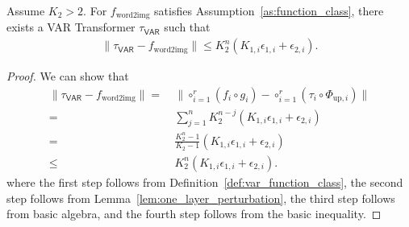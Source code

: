 \begin{theorem}\label{thm:var_universality}
    Assume $K_2 > 2$.
    For $f_\mathrm{word2img}$ satisfies Assumption~\ref{as:function_class}, there exists a VAR Transformer $\tau_{\mathsf{VAR}}$ such that
    \begin{align*}
        \|\tau_{\mathsf{VAR}} - f_\mathrm{word2img} \| \leq K_2^n( K_{1,i} \epsilon_{1,i} + \epsilon_{2,i} ).
    \end{align*}
\end{theorem}
\begin{proof}
    We can show that
    \begin{align*}
        \|\tau_{\mathsf{VAR}} - f_\mathrm{word2img} \|  = &~ \| \circ_{i=1}^r (f_i \circ g_i) - \circ_{i=1}^r (\tau_i \circ \Phi_{\mathrm{up},i}) \| \\
        = &~ \sum_{j=1}^n K_2^{n-j} ( K_{1,i} \epsilon_{1,i} + \epsilon_{2,i} )\\
        = &~ \frac{K_2^n - 1}{K_2 - 1}( K_{1,i} \epsilon_{1,i} + \epsilon_{2,i} ) \\
        \leq &~ K_2^n( K_{1,i} \epsilon_{1,i} + \epsilon_{2,i} ) .
    \end{align*}
    where the first step follows from Definition~\ref{def:var_function_class}, the second step follows from Lemma~\ref{lem:one_layer_perturbation}, the third step follows from basic algebra, and the fourth step follows from the basic inequality.  
\end{proof}
